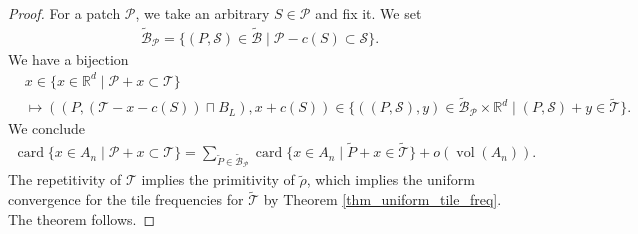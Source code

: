 \documentclass[10pt,a4paper]{amsart}
\DeclareMathOperator{\card}{card}
\DeclareMathOperator{\vol}{vol}
\begin{document}
\begin{proof}
    For a patch $\mathcal{P}$, we take an arbitrary $S\in\mathcal{P}$ and fix it. We set
    \begin{align*}
        \widetilde{\mathcal{B}}_{\mathcal{P}}
        =\{(P,\mathcal{S})\in\tilde{\mathcal{B}}\mid \mathcal{P}-c(S)\subset \mathcal{S}\}.
    \end{align*}
        We have a bijection
        \begin{align*}
            &x\in\{x\in\mathbb{R}^d\mid \mathcal{P}+x\subset\mathcal{T}\}\\
            &\mapsto ((P,(\mathcal{T}-x-c(S))\sqcap B_L), x+c(S))\in\{((P,\mathcal{S}),y)\in\widetilde{\mathcal{B}}_{\mathcal{P}}\times \mathbb{R}^d\mid (P,\mathcal{S})+y\in\tilde{\mathcal{T}}\}.
        \end{align*}
We conclude
\begin{align*}
    \card\{x\in A_n\mid \mathcal{P}+x\subset\mathcal{T}\}=\sum_{\tilde{P}\in\widetilde{\mathcal{B}}_{\mathcal{P}}}\card\{x\in A_n\mid \tilde{P}+x\in\tilde{\mathcal{T}}\}+o(\vol (A_n)).
\end{align*}
The repetitivity of $\mathcal{T}$ implies the primitivity of $\tilde{\rho}$, which implies the uniform convergence for the tile frequencies for $\tilde{\mathcal{T}}$ by
Theorem \ref{thm_uniform_tile_freq}.
The theorem follows.
\end{proof}
\end{document}
